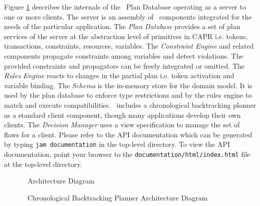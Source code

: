 \documentclass[10pt, letterpaper, twoside]{article}
\begin{document}
Figure \ref{SystemDiagram} describes the internals of the \ET\, Plan
Database operating as a server to one or more clients. The server is an
assembly of \ET\, components integrated for the needs of the particular
application. The {\em Plan Database} provides a set of plan services of the
server at the abstraction level of primitives in CAPR i.e. tokens,
transactions, constraints, resources, variables. The {\em Constraint
Engine} and related components propagate constraints among
variables and detect violations. The provided constraints and
propagators can be freely integrated or omitted. The {\em Rules Engine}
reacts to changes in the partial plan i.e. token activation and variable
binding. The {\em Schema} is the in-memory store for the domain model. It
is used by the plan database to enforce type restrictions and by the rules
engine to match and execute compatibilities.  \ET\, includes a chronological
backtracking planner as a standard client component, though many
applications develop their own clients. The {\em Decision Manager} uses a
view specification to manage the set of flaws for a client.  Please refer
to the API documentation which can be generated by typing {\tt jam
documentation} in the top-level directory.  To view the API documentation,
point your browser to the {\tt documentation/html/index.html} file at the
top-level directory.
\begin{figure}[htb]
\centering{}
\caption{\ET\, Architecture Diagram}
\label{SystemDiagram}
\end{figure}

\begin{figure}[hbt]
\centering{}
\caption{\ET\, Chronological Backtracking Planner Architecture Diagram}
\label{CBPlannerDiagram}
\end{figure}
\end{document}

